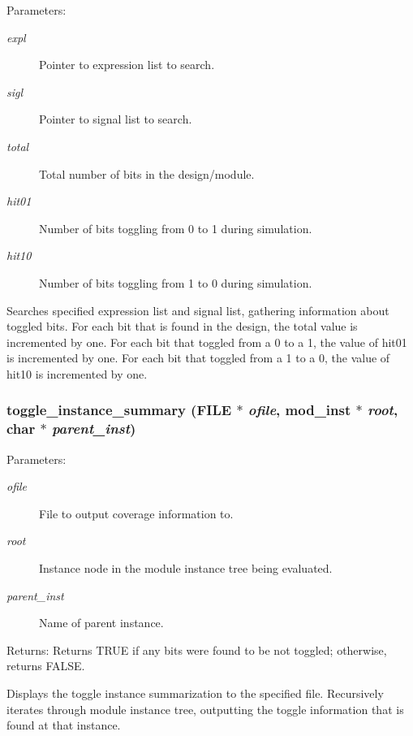 \begin{Desc}
\item[Parameters:]
\begin{description}
\item[{\em expl}]Pointer to expression list to search. \item[{\em sigl}]Pointer to signal list to search. \item[{\em total}]Total number of bits in the design/module. \item[{\em hit01}]Number of bits toggling from 0 to 1 during simulation. \item[{\em hit10}]Number of bits toggling from 1 to 0 during simulation.\end{description}
\end{Desc}
Searches specified expression list and signal list, gathering information about toggled bits. For each bit that is found in the design, the total value is incremented by one. For each bit that toggled from a 0 to a 1, the value of hit01 is incremented by one. For each bit that toggled from a 1 to a 0, the value of hit10 is incremented by one. 
\subsubsection{ toggle\_\-instance\_\-summary (FILE $\ast$ {\em ofile}, {\bf mod\_\-inst} $\ast$ {\em root}, char $\ast$ {\em parent\_\-inst})}\label{toggle_8c_a6}


\begin{Desc}
\item[Parameters:]
\begin{description}
\item[{\em ofile}]File to output coverage information to. \item[{\em root}]Instance node in the module instance tree being evaluated. \item[{\em parent\_\-inst}]Name of parent instance.\end{description}
\end{Desc}
\begin{Desc}
\item[Returns:]Returns TRUE if any bits were found to be not toggled; otherwise, returns FALSE.\end{Desc}
Displays the toggle instance summarization to the specified file. Recursively iterates through module instance tree, outputting the toggle information that is found at that instance. 
